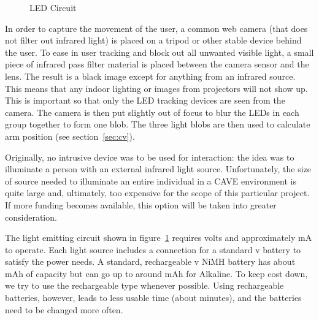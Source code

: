 \documentclass{article}
\begin{document}
\begin{figure}[h!t]
\begin{center}
\end{center}
\caption{LED Circuit}
\label{fig:circuit}
\end{figure}

In order to capture the movement of the user, a common web camera (that does
not filter out infrared light) is placed on a tripod or other stable device
behind the user.  To ease in user tracking and block out all unwanted visible
light, a small piece of infrared pass filter material is placed between the
camera sensor and the lens.  The result is a black image except
for anything from an infrared source.  This means that any indoor lighting or
images from projectors will not show up.  This is important so that only the
LED tracking devices are seen from the camera.  The camera is then put slightly
out of focus to blur the LEDs in each group together to form one blob.  The
three light blobs are then used to calculate arm position (see section~\ref{sec:cv}).

Originally, no intrusive device was to be used for interaction: the idea was to
illuminate a person with an external infrared light source.  Unfortunately,
the size of source needed to illuminate an entire individual in a CAVE
environment is quite large and, ultimately, too expensive for the scope of this
particular project.  If more funding becomes available, this option will be
taken into greater consideration.

The light emitting circuit shown in figure~\ref{fig:circuit} requires \unit[9]{volts} and
approximately \unit[400]{mA} to operate.  Each light source includes a connection for a
standard \unit[9]{v} battery to satisfy the power needs.  A standard, rechargeable \unit[9]{v}
NiMH battery has about \unit[150]{mAh} of capacity but can go up to around \unit[625]{mAh} for
Alkaline.  To keep cost down, we try to use the rechargeable type whenever
possible.  Using rechargeable batteries, however, leads to less usable time
(about \unit[22]{minutes}), and the batteries need to be changed more often. 
\end{document}
